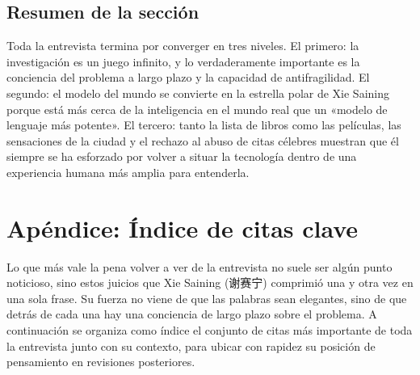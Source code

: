 \documentclass[a4paper,12pt]{article}
\begin{document}
\subsection{Resumen de la sección}

Toda la entrevista termina por converger en tres niveles. El primero: la investigación es un juego infinito, y lo verdaderamente importante es la conciencia del problema a largo plazo y la capacidad de antifragilidad. El segundo: el modelo del mundo se convierte en la estrella polar de Xie Saining porque está más cerca de la inteligencia en el mundo real que un «modelo de lenguaje más potente». El tercero: tanto la lista de libros como las películas, las sensaciones de la ciudad y el rechazo al abuso de citas célebres muestran que él siempre se ha esforzado por volver a situar la tecnología dentro de una experiencia humana más amplia para entenderla.

\section*{Apéndice: Índice de citas clave}

Lo que más vale la pena volver a ver de la entrevista no suele ser algún punto noticioso, sino estos juicios que Xie Saining (谢赛宁) comprimió una y otra vez en una sola frase. Su fuerza no viene de que las palabras sean elegantes, sino de que detrás de cada una hay una conciencia de largo plazo sobre el problema. A continuación se organiza como índice el conjunto de citas más importante de toda la entrevista junto con su contexto, para ubicar con rapidez su posición de pensamiento en revisiones posteriores.
\end{document}
